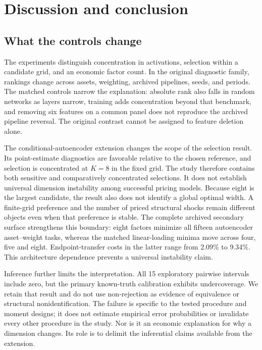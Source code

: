 \section{Discussion and conclusion}

\subsection{What the controls change}

The experiments distinguish concentration in activations, selection within a candidate grid, and an economic factor count. In the original diagnostic family, rankings change across assets, weighting, archived pipelines, seeds, and periods. The matched controls narrow the explanation: absolute rank also falls in random networks as layers narrow, training adds concentration beyond that benchmark, and removing six features on a common panel does not reproduce the archived pipeline reversal. The original contrast cannot be assigned to feature deletion alone.

The conditional-autoencoder extension changes the scope of the selection result. Its point-estimate diagnostics are favorable relative to the chosen reference, and selection is concentrated at $K=8$ in the fixed grid. The study therefore contains both sensitive and comparatively concentrated selections. It does not establish universal dimension instability among successful pricing models. Because eight is the largest candidate, the result also does not identify a global optimal width. A finite-grid preference and the number of priced structural shocks remain different objects even when that preference is stable. The complete archived secondary surface strengthens this boundary: eight factors minimize all fifteen autoencoder asset--weight tasks, whereas the matched linear-loading minima move across four, five and eight. Endpoint-transfer costs in the latter range from 2.09\% to 9.34\%. This architecture dependence prevents a universal instability claim.

Inference further limits the interpretation. All 15 exploratory pairwise intervals include zero, but the primary known-truth calibration exhibits undercoverage. We retain that result and do not use non-rejection as evidence of equivalence or structural nonidentification. The failure is specific to the tested procedure and moment designs; it does not estimate empirical error probabilities or invalidate every other procedure in the study. Nor is it an economic explanation for why a dimension changes. Its role is to delimit the inferential claims available from the extension.


